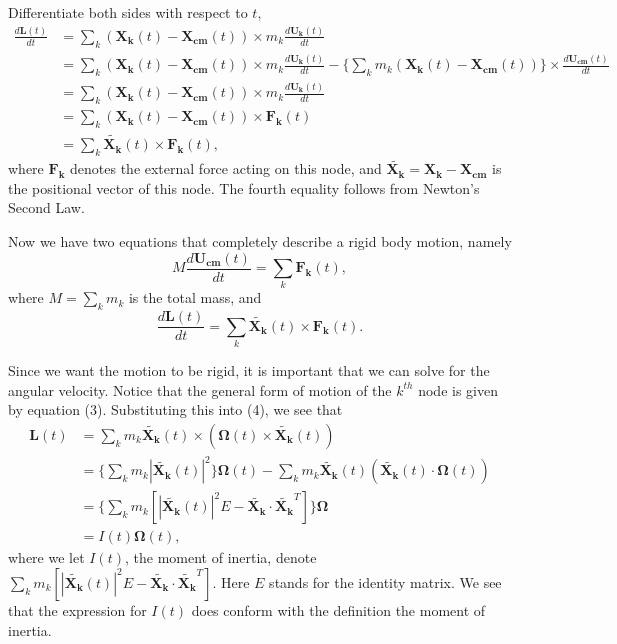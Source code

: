 \documentclass[12pt]{article}
\renewcommand{\(}{\left (}
\renewcommand{\)}{\right )}
\renewcommand{\vec}[1]{\boldsymbol{#1}}
\begin{document}
Differentiate both sides with respect to $t,$
\begin{align}
	\frac{d\vec{L}(t)}{dt} &= \sum_k (\vec{X_k}(t) - \vec{X_{cm}}(t)) \times m_k \frac{d\vec{U_k}(t)}{dt}\\
	&=\sum_k (\vec{X_k}(t) - \vec{X_{cm}}(t)) \times m_k \frac{d\vec{U_k}(t)}{dt} - \{\sum_k m_k (\vec{X_k}(t)- \vec{X_{cm}}(t)) \} \times \frac{d\vec{U_{cm}}(t)}{dt} \\
	&=\sum_k (\vec{X_k}(t) - \vec{X_{cm}}(t)) \times m_k \frac{d\vec{U_k}(t)}{dt}\\
	&= \sum_k (\vec{X_k}(t) - \vec{X_{cm}}(t)) \times \vec{F_k}(t) \\
	&= \sum_k \vec{\widetilde{X_k}}(t) \times \vec{F_k}(t),
\end{align}
where $\vec{F_k}$ denotes the external force acting on this node, and $\vec{\widetilde{X_k}} = \vec{X_k} - \vec{X_{cm}}$ is the positional vector of this node. The fourth equality follows from Newton's Second Law.

Now we have two equations that completely describe a rigid body motion, namely
\begin{equation}
	M \frac{d\vec{U_{cm}}(t)}{dt} = \sum_k \vec{F_k}(t),
\end{equation}
where $M = \sum_k m_k$ is the total mass, and \begin{equation}
\frac{d\vec{L}(t)}{dt} = \sum_k \vec{\widetilde{X_k}}(t) \times \vec{F_k}(t).
\end{equation}

Since we want the motion to be rigid, it is important that we can solve for the angular velocity. Notice that the general form of motion of the $k^{th}$ node is given by equation (3). Substituting this into (4), we see that
\begin{align}
	\vec{L}(t) &= \sum_k m_k \vec{\widetilde{X_k}}(t) \times (\vec{\Omega}(t) \times \vec{\widetilde{X_k}}(t)) \\
	&= \{\sum_k m_k |\vec{\widetilde{X_k}}(t)|^2\}\vec{\Omega}(t) - \sum_k m_k \vec{\widetilde{X_k}}(t)(\vec{\widetilde{X_k}}(t)\cdot \vec{\Omega}(t))\\
	&= \{\sum_k m_k [|\vec{\widetilde{X_k}}(t)|^2 E - \vec{\widetilde{X_k}} \cdot \vec{\widetilde{X_k}}^T ]\} \vec{\Omega} \\
	&= {I}(t) \vec{\Omega}(t),
\end{align}
where we let $I(t)$, the moment of inertia, denote $\sum_k m_k [|\vec{\widetilde{X_k}}(t)|^2 E - \vec{\widetilde{X_k}} \cdot \vec{\widetilde{X_k}}^T ].$ Here $E$ stands for the identity matrix. We see that the expression for $I(t)$ does conform with the definition the moment of inertia.
\end{document}
